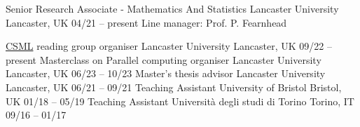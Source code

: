 


\begin{cventries}

  \cventry
    {Senior Research Associate - Mathematics And Statistics}
    {Lancaster University}
    {Lancaster, UK}
    {04\slash 21 -- present}
    {Line manager: Prof. P. Fearnhead}
    
  \cventry
    {\href{https://lu-csml.github.io/}{CSML} reading group organiser}
    {Lancaster University} 
    {Lancaster, UK}
    {09\slash 22 -- present}
    {}
    \vspace{-0.25cm}    
  \cventry
    {Masterclass on Parallel computing organiser}
    {Lancaster University} 
    {Lancaster, UK}
    {06\slash 23 -- 10\slash 23}
    {}
    \vspace{-0.25cm}
  \cventry
    {Master's thesis advisor}
    {Lancaster University} 
    {Lancaster, UK}
    {06\slash 21 -- 09\slash 21}
    {}
    \vspace{-0.25cm}
  \cventry
	{Teaching Assistant}
	{University of Bristol}
    {Bristol, UK}
	{01\slash 18 -- 05\slash 19}
    {}
    \vspace{-0.25cm}
  \cventry
	{Teaching Assistant}
	{Università degli studi di Torino}
    {Torino, IT}
	{09\slash 16 -- 01\slash 17}
    {}
    \vspace{-0.25cm}
\end{cventries}

